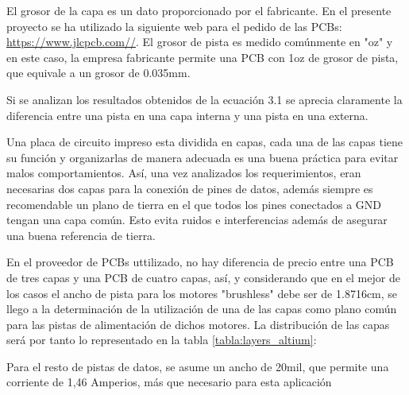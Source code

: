 El grosor de la capa es un dato proporcionado por el fabricante. En el presente proyecto se ha utilizado la siguiente web para el pedido de las PCBs: \url{https://www.jlcpcb.com//}. \newline 
El grosor de pista es medido comúnmente en "oz" y en este caso, la empresa fabricante permite una PCB con 1oz de grosor de pista, que equivale a un grosor de 0.035mm.\newline

Si se analizan los resultados obtenidos de la ecuación 3.1 se aprecia claramente la diferencia entre una pista en una capa interna y una pista en una externa. \newline

Una placa de circuito impreso esta dividida en capas, cada una de las capas tiene su función y organizarlas de manera adecuada es una buena práctica para evitar malos comportamientos. Así, una vez analizados los requerimientos, eran necesarias dos capas para la conexión de pines de datos, además siempre es recomendable un plano de tierra en el que todos los pines conectados a GND tengan una capa común. Esto evita ruidos e interferencias además de asegurar una buena referencia de tierra. \newline

En el proveedor de PCBs uttilizado, no hay diferencia de precio entre una PCB de tres capas y una PCB de cuatro capas, así, y considerando que en el mejor de los casos el ancho de pista para los motores "brushless" debe ser de 1.8716cm, se llego a la determinación de la utilización de una de las capas como plano común para las pistas de alimentación de dichos motores. La distribución de las capas será por tanto lo representado en la tabla \ref{tabla:layers_altium}: 

Para el resto de pistas de datos, se asume un ancho de 20mil, que permite una corriente de 1,46 Amperios, más que necesario para esta aplicación


